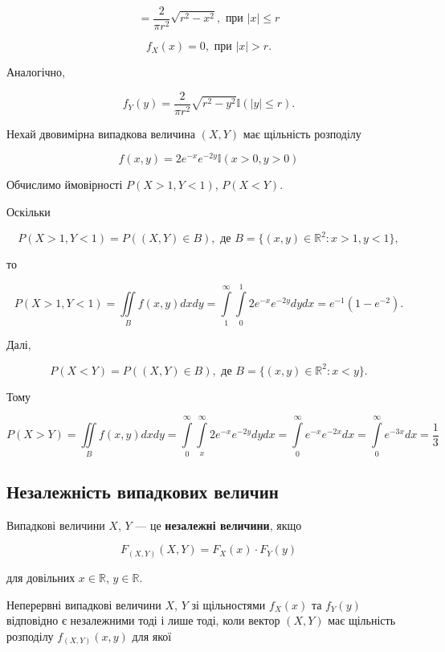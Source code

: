 $$= \frac{2}{\pi r^2}\sqrt{r^2 - x^2}, \text{ при } |x| \leqslant r$$

$$f_X(x) = 0, \text{ при } |x| > r.$$

Аналогічно,

$$f_Y(y)
= \frac{2}{\pi r^2}\sqrt{r^2 - y^2} \mathbb{I}(|y| \leqslant r).$$

\begin{example}
    Нехай двовимірна випадкова величина $(X, Y)$ має щільність розподілу
\end{example}

$$f(x, y) = 2 e^{-x} e^{-2y} \mathbb{I}(x > 0, y > 0)$$

Обчислимо ймовірності $P(X > 1, Y < 1)$, $P(X < Y)$.

Оскільки 

$$P(X > 1, Y < 1) = P((X,Y) \in B), \text{ де } B = \{(x, y) \in \mathbb{R}^2: x > 1, y < 1\},$$

то 

$$P(X > 1, Y < 1) = \iint\limits_B f(x, y) dx dy
= \int\limits_1^{\infty} \int\limits_0^1 2 e^{-x} e^{-2y} dy dx
= e^{-1}(1-e^{-2}).$$

Далі,

$$P(X < Y) = P((X,Y) \in B), \text{ де } B = \{(x, y) \in \mathbb{R}^2: x < y\}.$$

Тому 

$$P(X > Y) = \iint\limits_B f(x, y) dx dy
= \int\limits_0^{\infty} \int\limits_x^{\infty} 2 e^{-x} e^{-2y} dy dx
= \int\limits_0^{\infty} e^{-x} e^{-2x} dx
= \int\limits_0^{\infty} e^{-3x} dx
= \frac{1}{3}$$

\subsection{Незалежність випадкових величин}


Випадкові величини $X$, $Y$ --- це \textbf{незалежні величини}, якщо 

\begin{equation}
    F_{(X, Y)}(X, Y) =F_{X}(x) \cdot F_{Y}(y) 
\end{equation}

для довільних $x \in \mathbb{R}$, $y \in \mathbb{R}$.

\begin{theorem}
    
\end{theorem}

Неперервні випадкові величини $X$, $Y$ зі щільностями $f_X(x)$ та $f_Y(y)$
відповідно є незалежними тоді і лише тоді, коли вектор $(X, Y)$ має щільність
розподілу $f_{(X, Y)} (x, y)$ для якої

